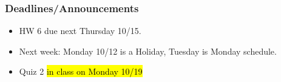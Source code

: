 
\begin{frame}
    \frametitle{Deadlines/Announcements}
\begin{itemize}
            \item HW 6 due next Thursday 10/15.
            \item Next week: Monday 10/12 is a Holiday, Tuesday is Monday schedule.
            \item Quiz 2 \hl{in class on Monday 10/19} %
        \end{itemize}
\end{frame}
